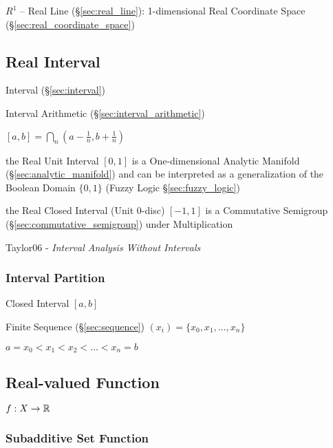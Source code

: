$R^1$ -- Real Line (\S\ref{sec:real_line}): 1-dimensional Real
Coordinate Space (\S\ref{sec:real_coordinate_space})



\subsection{Real Interval}\label{sec:real_interval}

Interval (\S\ref{sec:interval})

Interval Arithmetic (\S\ref{sec:interval_arithmetic})

$[a,b] = \bigcap_n (a - \frac{1}{n}, b + \frac{1}{n})$

the Real Unit Interval $[0,1]$ is a One-dimensional Analytic Manifold
(\S\ref{sec:analytic_manifold}) and can be interpreted as a generalization of
the Boolean Domain $\{0, 1\}$ (Fuzzy Logic \S\ref{sec:fuzzy_logic})

the Real Closed Interval (Unit 0-disc) $[-1,1]$ is a Commutative Semigroup
(\S\ref{sec:commutative_semigroup}) under Multiplication

Taylor06 - \emph{Interval Analysis Without Intervals}



\subsubsection{Interval Partition}\label{sec:interval_partition}

Closed Interval $[a,b]$

Finite Sequence (\S\ref{sec:sequence}) $(x_i) = \{ x_0, x_1, \ldots,
x_n \}$

$a = x_0 < x_1 < x_2 < \ldots < x_n = b$



\subsection{Real-valued Function}\label{sec:real_valued}

$f : X \rightarrow \mathbb{R}$



\subsubsection{Subadditive Set Function}\label{sec:subadditive_set_function}

